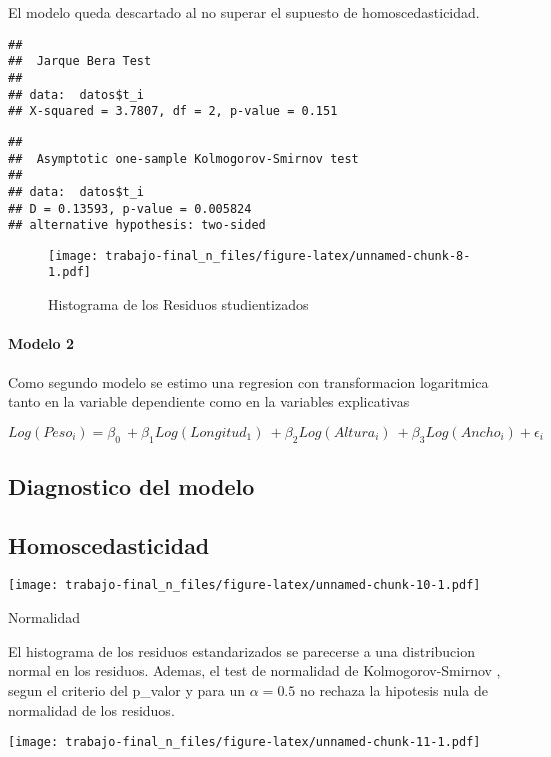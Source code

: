 \documentclass[
]{article}
\begin{document}
El modelo queda descartado al no superar el supuesto de
homoscedasticidad.

\begin{verbatim}
## 
##  Jarque Bera Test
## 
## data:  datos$t_i
## X-squared = 3.7807, df = 2, p-value = 0.151
\end{verbatim}

\begin{verbatim}
## 
##  Asymptotic one-sample Kolmogorov-Smirnov test
## 
## data:  datos$t_i
## D = 0.13593, p-value = 0.005824
## alternative hypothesis: two-sided
\end{verbatim}

\begin{figure}
\centering
\texttt{[image: trabajo-final\_n\_files/figure-latex/unnamed-chunk-8-1.pdf]}
\caption{Histograma de los Residuos studientizados}
\end{figure}

\paragraph{Modelo 2}\label{modelo-2}

Como segundo modelo se estimo una regresion con transformacion
logaritmica tanto en la variable dependiente como en la variables
explicativas

\[Log(Peso_i) = \beta_0\ + \beta_1Log(Longitud_1)\ + \beta_2Log(Altura_i)\  +  \beta_3Log(Ancho_{i}) +\epsilon_i \]

\subsection{Diagnostico del modelo}\label{diagnostico-del-modelo-1}

\subsection{Homoscedasticidad}\label{homoscedasticidad-1}

\texttt{[image: trabajo-final\_n\_files/figure-latex/unnamed-chunk-10-1.pdf]}

Normalidad

El histograma de los residuos estandarizados se parecerse a una
distribucion normal en los residuos. Ademas, el test de normalidad de
Kolmogorov-Smirnov , segun el criterio del p\_valor y para un
\(\alpha=0.5\) no rechaza la hipotesis nula de normalidad de los
residuos.

\texttt{[image: trabajo-final\_n\_files/figure-latex/unnamed-chunk-11-1.pdf]}
\end{document}
